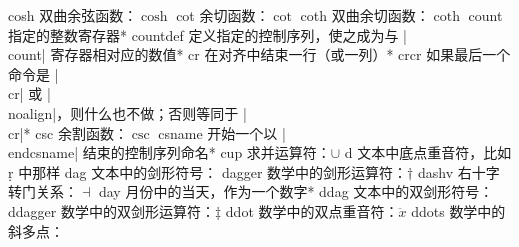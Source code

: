 \capcs cosh {双曲余弦函数：$\cosh$}{}{}
\capcs cot {余切函数：$\cot$}{}{}
\capcs coth {双曲余切函数：$\coth$}{}{}
\capcs count {指定的整数寄存器}*{}
\capcs countdef {定义指定的控制序列，使之成为与 |\\count| 寄存器相对应的数值}*{}
\capcs cr {在对齐中结束一行（或一列）}*{}
\capcs crcr {如果最后一个命令是 |\\cr| 或 |\\noalign|，则什么也不做；否则等同于 |\\cr|}*{}
\capcs csc {余割函数：$\csc$}{}{}
\capcs csname {开始一个以 |\\endcsname| 结束的控制序列命名}*{}
\capcs cup {求并运算符：$\cup$}{}{}
\capcs d {文本中底点重音符，比如 \d r 中那样}{}{}%
\capcs dag {文本中的剑形符号：\dag}{}{}
\capcs dagger {数学中的剑形运算符：$\dagger$}{}{}
\capcs dashv {右十字转门关系：$\dashv$}{}{}
\capcs day {月份中的当天，作为一个数字}*{}
\capcs ddag {文本中的双剑形符号：\ddag}{}{}
\capcs ddagger {数学中的双剑形运算符：$\ddagger$}{}{}
\capcs ddot  {数学中的双点重音符：$\ddot x$}{}{}
\capcs ddots {数学中的斜多点：\smash{$\ddots$}}{}{}
